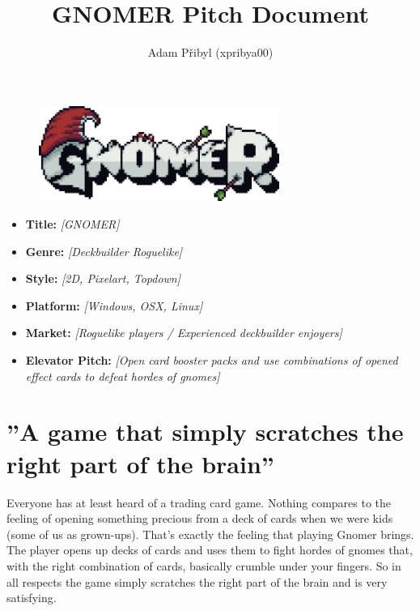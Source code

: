 \documentclass[a4paper,10pt,english]{article}
\title{%
GNOMER Pitch Document%
}
\author{%
Adam Přibyl (xpribya00)%
}
\date{}
\newcommand{\ph}[1]{\textit{[#1]}}
\begin{document}
\maketitle
\thispagestyle{empty}

\begin{figure}[h!]
    \centering
    \includegraphics[width=0.7\textwidth]{title.png}
    \label{fig:title}
\end{figure}

{%
\large

\begin{itemize}

\item[] \textbf{Title:} \ph{GNOMER}

\item[] \textbf{Genre:} \ph{Deckbuilder Roguelike}

\item[] \textbf{Style:} \ph{2D, Pixelart, Topdown}

\item[] \textbf{Platform:} \ph{Windows, OSX, Linux}

\item[] \textbf{Market:} \ph{Roguelike players / Experienced deckbuilder enjoyers}

\item[] \textbf{Elevator Pitch:} \ph{Open card booster packs and use combinations of opened effect cards to defeat hordes of gnomes}

\end{itemize}
}

\section*{\centering ''A game that simply scratches the right part of the brain''}

Everyone has at least heard of a trading card game. Nothing compares to the feeling of opening something precious from a deck of cards when we were kids (some of us as grown-ups). That's exactly the feeling that playing Gnomer brings. The player opens up decks of cards and uses them to fight hordes of gnomes that, with the right combination of cards, basically crumble under your fingers. So in all respects the game simply scratches the right part of the brain and is very satisfying. 
\end{document}
